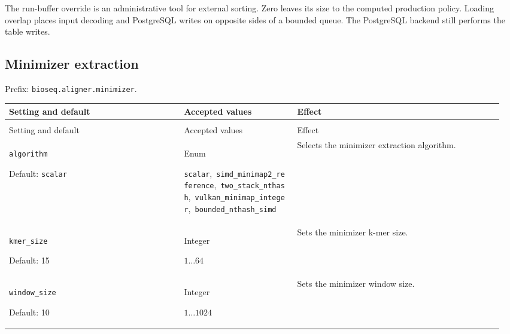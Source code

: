 The run-buffer override is an administrative tool for external sorting.
Zero leaves its size to the computed production policy. Loading overlap places
input decoding and PostgreSQL writes on opposite sides of a bounded queue.
The PostgreSQL backend still performs the table writes.

\subsection{Minimizer extraction}

Prefix: \nolinkurl{bioseq.aligner.minimizer}.

\begingroup
\small
\setlength{\tabcolsep}{4pt}
\renewcommand{\arraystretch}{1.16}
\begin{longtable}{@{}>{\raggedright\arraybackslash}p{0.34\linewidth}>{\raggedright\arraybackslash}p{0.22\linewidth}>{\raggedright\arraybackslash}p{0.40\linewidth}@{}}
\toprule
Setting and default & Accepted values & Effect \\
\midrule
\endfirsthead
\multicolumn{3}{@{}l}{Prefix: \nolinkurl{bioseq.aligner.minimizer} (continued)} \\
\toprule
Setting and default & Accepted values & Effect \\
\midrule
\endhead
\bottomrule
\endfoot
\nolinkurl{algorithm}\par Default: \nolinkurl{scalar} & Enum\par \nolinkurl{scalar},\allowbreak\ \nolinkurl{simd_minimap2_reference},\allowbreak\ \nolinkurl{two_stack_nthash},\allowbreak\ \nolinkurl{vulkan_minimap_integer},\allowbreak\ \nolinkurl{bounded_nthash_simd} & Selects the minimizer extraction algorithm. \\[4pt]
\nolinkurl{kmer_size}\par Default: 15 & Integer\par $1\ldots 64$ & Sets the minimizer k-mer size. \\[4pt]
\nolinkurl{window_size}\par Default: 10 & Integer\par $1\ldots 1024$ & Sets the minimizer window size. \\[4pt]
\end{longtable}
\endgroup

